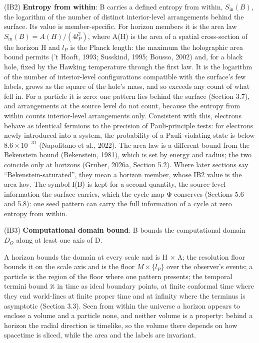 \documentclass[
]{article}
\begin{document}
(IB2) \textbf{Entropy from within}: B carries a defined entropy from
within, \(S_{\mathrm{in}}(B)\), the logarithm of the number of distinct
interior-level arrangements behind the surface. Its value is
member-specific. For horizon members it is the area law
\(S_{\mathrm{in}}(B) = A(H) / (4 l_P^2)\), where A(H) is the area of a
spatial cross-section of the horizon H and \(l_{P}\) is the Planck
length: the maximum the holographic area bound permits ('t Hooft, 1993;
Susskind, 1995; Bousso, 2002) and, for a black hole, fixed by the
Hawking temperature through the first law. It is the logarithm of the
number of interior-level configurations compatible with the surface's
few labels, grows as the square of the hole's mass, and so exceeds any
count of what fell in. For a particle it is zero: one pattern lies
behind the surface (Section 3.7), and arrangements at the source level
do not count, because the entropy from within counts interior-level
arrangements only. Consistent with this, electrons behave as identical
fermions to the precision of Pauli-principle tests: for electrons newly
introduced into a system, the probability of a Pauli-violating state is
below \(8.6 \times 10^{-31}\) (Napolitano et al., 2022). The area law is
a different bound from the Bekenstein bound (Bekenstein, 1981), which is
set by energy and radius; the two coincide only at horizons (Gruber,
2026a, Section 5.2). Where later sections say ``Bekenstein-saturated'',
they mean a horizon member, whose IB2 value is the area law. The symbol
I(B) is kept for a second quantity, the source-level information the
surface carries, which the cycle map Φ conserves (Sections 5.6 and 5.8):
one seed pattern can carry the full information of a cycle at zero
entropy from within.

(IB3) \textbf{Computational domain bound}: B bounds the computational
domain \(D_O\) along at least one axis of D.

A horizon bounds the domain at every scale and is H × Λ; the resolution
floor bounds it on the scale axis and is the floor \(M \times \{l_P\}\)
over the observer's events; a particle is the region of the floor where
one pattern presents; the temporal termini bound it in time as ideal
boundary points, at finite conformal time where they end world-lines at
finite proper time and at infinity where the terminus is asymptotic
(Section 3.3). Seen from within the universe a horizon appears to
enclose a volume and a particle none, and neither volume is a property:
behind a horizon the radial direction is timelike, so the volume there
depends on how spacetime is sliced, while the area and the labels are
invariant.
\end{document}
